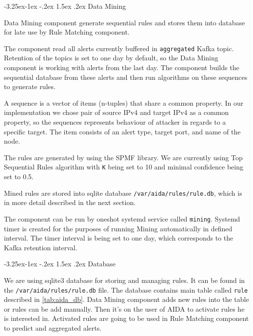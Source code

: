\documentclass[a4paper]{article} %
\makeatletter
\renewcommand\subsection{\@startsection{subsection}{2}{\z@}%
                   {-3.25ex\@plus -1ex \@minus -.2ex}%
                   {1.5ex \@plus .2ex}%
                   {\normalfont\sffamily\large\bfseries\color{projectcolor}}}
\makeatother
\begin{document}
\subsection{Data Mining}

Data Mining component generate sequential rules and stores them into database for late use by Rule Matching component.

The component read all alerts currently buffered in \texttt{aggregated} Kafka topic. Retention of the topics is set to one day by default, so the Data Mining component is working with alerts from the last day. The component builds the sequential database from these alerts and then run algorithms on these sequences to generate rules.

A sequence is a vector of items (n-tuples) that share a common property. In our implementation we chose pair of source IPv4 and target IPv4 as a common property, so the sequences represents behaviour of attacker in regards to a specific target. The item consists of an alert type, target port, and name of the node.

The rules are generated by using the SPMF library. We are currently using Top Sequential Rules algorithm with \texttt{K} being set to 10 and minimal confidence being set to 0.5.

Mined rules are stored into sqlite database \texttt{/var/aida/rules/rule.db}, which is in more detail described in the next section.

The component can be run by oneshot systemd service called \texttt{mining}. Systemd timer is created for the purposes of running Mining automatically in defined interval. The timer interval is being set to one day, which corresponds to the Kafka retention interval.


\subsection{Database}

We are using sqlite3 database for storing and managing rules. It can be found in the \texttt{/var/aida/rules/rule.db} file. The database contains main table called \texttt{rule} described in \autoref{tab:aida_db}. Data Mining component adds new rules into the table or rules can be add manually. Then it's on the user of AIDA to activate rules he is interested in. Activated rules are going to be used in Rule Matching component to predict and aggregated alerts.
\end{document}
